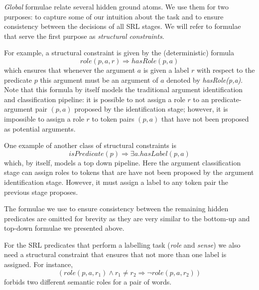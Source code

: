 
\emph{Global} formulae relate several hidden ground atoms. We use them for two purposes: to capture some of our intuition about the task and to ensure consistency between the decisions of all SRL stages. We will refer to formulae that serve the first purpose as \emph{structural constraints}.

For example, a structural constraint is given by the (deterministic) formula
\[role(p,a,r) \Rightarrow hasRole(p,a)\]
which ensures that whenever the argument $a$ is given a label $r$ with respect to the predicate $p$ this argument must be an argument of $a$ denoted by \emph{hasRole(p,a)}. Note that this formula by itself models the traditional argument identification and classification pipeline: it is possible to not assign a role $r$ to an predicate-argument pair $(p,a)$ proposed by the identification stage; however, it is impossible to assign a role $r$ to token pairs $(p,a)$ that have not been proposed as potential arguments.

One example of another class of structural constraints is 
\[
isPredicate(p)\Rightarrow\exists a.hasLabel(p,a)
\]
which, by itself, models a top down pipeline. Here the argument classification stage can assign roles to tokens that are have not been proposed by the argument identification stage. However, it must assign a label to any token pair the previous stage proposes. 

The formulae we use to ensure consistency between the remaining hidden predicates are omitted for brevity as they are very similar to the bottom-up and top-down formulae we presented above.

For the SRL predicates that perform a labelling task (\emph{role} and \emph{sense}) we also need a structural constraint that ensures that not more than one label is assigned. For instance,
\[
(role(p,a,r_1) \wedge r_1 \neq r_2 \Rightarrow \neg role(p,a,r_2)  )
\]
forbids two different semantic roles for a pair of words. 


